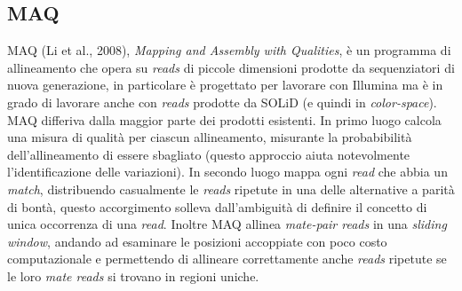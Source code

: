 \documentclass[conference]{IEEEtran}
\begin{document}
	\subsection{MAQ}
MAQ (Li et al., 2008), \textit{Mapping and Assembly with Qualities}, è un programma di allineamento che opera su \textit{reads} di piccole dimensioni prodotte da sequenziatori di nuova generazione, in particolare è progettato per lavorare con Illumina ma è in grado di lavorare anche con \textit{reads} prodotte da SOLiD (e quindi in \textit{color-space}).\\

MAQ differiva dalla maggior parte dei prodotti esistenti. In primo luogo calcola una misura di qualità per ciascun allineamento, misurante la probabibilità dell'allineamento di essere sbagliato (questo approccio aiuta notevolmente l'identificazione delle variazioni). In secondo luogo mappa ogni \textit{read} che abbia un \textit{match}, distribuendo casualmente le \textit{reads} ripetute in una delle alternative a parità di bontà, questo accorgimento solleva dall'ambiguità di definire il concetto di unica occorrenza di una \textit{read}. Inoltre MAQ allinea \textit{mate-pair reads} in una \textit{sliding window}, andando ad esaminare le posizioni accoppiate con poco costo computazionale e permettendo di allineare correttamente anche \textit{reads} ripetute se le loro \textit{mate reads} si trovano in regioni uniche.\\
\end{document}
